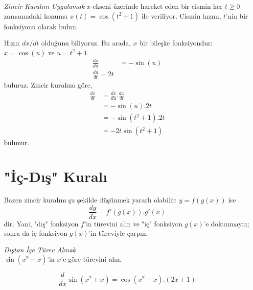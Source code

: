 \begin{ornek}\textit{Zincir Kuralını Uygulamak}
$x$-ekseni üzerinde hareket eden bir cismin her $t \geq 0$ zamanındaki konumu $x(t)=\cos (t^2+1)$ ile veriliyor. Cismin hızını, $t$'nin bir fonksiyonu olarak bulun.
\end{ornek}
\begin{cozum}
	Hızın $dx/dt$ olduğunu biliyoruz. Bu arada, $x$ bir bileşke fonksiyondur: $x=\cos (u)$ ve $u=t^2+1$.
	\begin{equation*}
	\begin{split}
	\frac{dx}{du}&=-\sin (u)\\
	\frac{du}{dt}=2t
	\end{split}
	\end{equation*}
buluruz. Zincir kuralına göre,
	\begin{equation*}
	\begin{split}
	\frac{dx}{dt}&=\frac{dx}{du}.\frac{dx}{dt}\\
		&=-\sin (u).2t\\
		&=-\sin (t^2+1).2t\\
		&=-2t\sin(t^2+1)
	\end{split}
	\end{equation*}
bulunur.
\end{cozum}
\section{\protect "İç-Dış" Kuralı}
Bazen zincir kuralını şu şekilde düşünmek yararlı olabilir: $y=f(g(x))$ ise
	\begin{equation*}
		\frac{dy}{dx}=f'(g(x)).g'(x)
	\end{equation*}
dir. Yani, "dış" fonksiyon $f$'in türevini alın ve "iç" fonksiyon $g(x)$'e dokunmayın; sonra da iç fonksiyon $g(x)$'in türeviyle çarpın.
\begin{ornek}\textit{Dıştan İçe Türev Almak}\\
$\sin (x^2+x)$'in $x$'e göre türevini alın.
\end{ornek}
\begin{cozum}
	\begin{equation*}
	\frac{d}{dx}\sin (x^2+x)=\cos (x^2+x).(2x+1)
	\end{equation*}
\end{cozum}
